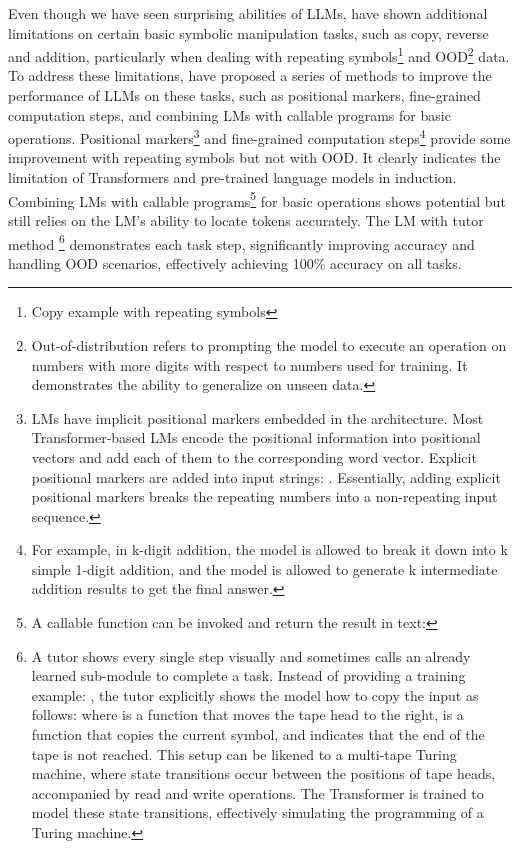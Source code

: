 Even though we have seen surprising abilities of LLMs, \textcite{qian2022limitations} have shown additional limitations on certain basic symbolic manipulation tasks, such as copy, reverse and addition, particularly when dealing with repeating symbols\footnote{Copy example with repeating symbols } and OOD\footnote{Out-of-distribution refers to prompting the model to execute an operation on numbers with more digits with respect to numbers used for training. It demonstrates the ability to generalize on unseen data.} data.
To address these limitations, \textcite{qian2022limitations} have proposed a series of methods to improve the performance of LLMs on these tasks, such as positional markers, fine-grained computation steps, and combining LMs with callable programs for basic operations.
Positional markers\footnote{LMs have implicit positional markers embedded in the architecture. Most Transformer-based LMs encode the positional information into positional vectors and add each of
	them to the corresponding word vector. Explicit positional markers are added into input strings: .
	Essentially, adding explicit positional markers breaks the repeating numbers into a non-repeating input sequence.} and fine-grained computation steps\footnote{For example, in k-digit addition, the model is allowed to break it down into k simple 1-digit addition, and the model is allowed to generate k intermediate addition results to get the final answer.} provide some improvement with repeating symbols but not with OOD\@.
It clearly indicates the limitation of Transformers and pre-trained language models in induction.
Combining LMs with callable programs\footnote{A callable function  can be invoked and return the result in text: } for basic operations shows potential but still relies on the LM's ability to locate tokens accurately.
The LM with tutor method
\footnote{A tutor shows every single step visually and sometimes calls an already learned sub-module to complete a task. Instead of providing a training example: , the tutor explicitly shows the model how to copy the input as follows:  where  is a function that moves the tape head to the right,  is a function that copies the current symbol, and  indicates that the end of the tape is not reached. This setup can be likened to a multi-tape Turing machine, where state transitions occur between the positions of tape heads, accompanied by read and write operations. The Transformer is trained to model these state transitions, effectively simulating the programming of a Turing machine.} demonstrates each task step, significantly improving accuracy and handling OOD scenarios, effectively achieving 100\% accuracy on all tasks.

